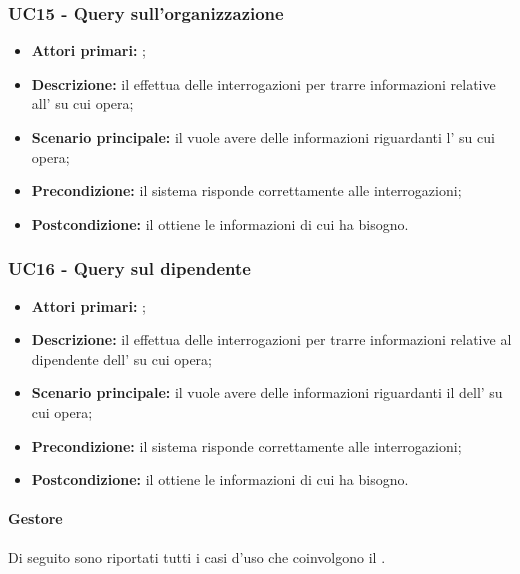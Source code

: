 \documentclass[casi-duso]{subfiles}
\begin{document}
\subsubsection{UC15 - Query sull'organizzazione}
\label{subsub:UC15}

\begin{itemize}
  \item \textbf{Attori primari:} ;
  \item \textbf{Descrizione:} il  effettua delle interrogazioni per trarre informazioni relative all' su cui opera;
  \item \textbf{Scenario principale:} il  vuole avere delle informazioni riguardanti l' su cui opera;
  \item \textbf{Precondizione:} il sistema risponde correttamente alle interrogazioni;
  \item \textbf{Postcondizione:} il  ottiene le informazioni di cui ha bisogno.

\end{itemize}


\subsubsection{UC16 - Query sul dipendente}
\label{subsub:UC16}

\begin{itemize}
  \item \textbf{Attori primari:} ;
  \item \textbf{Descrizione:} il  effettua delle interrogazioni per trarre informazioni relative al dipendente dell' su cui opera;
  \item \textbf{Scenario principale:} il  vuole avere delle informazioni riguardanti il dell' su cui opera;
  \item \textbf{Precondizione:} il sistema risponde correttamente alle interrogazioni;
  \item \textbf{Postcondizione:} il  ottiene le informazioni di cui ha bisogno.

\end{itemize}

\paragraph{Gestore}
Di seguito sono riportati tutti i casi d'uso che coinvolgono il  .
\end{document}
